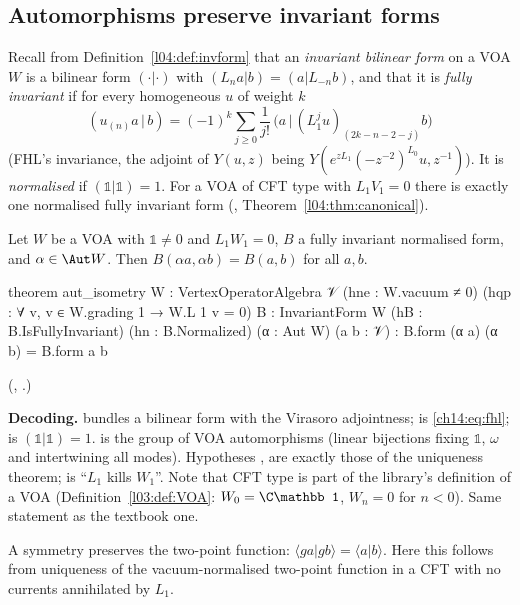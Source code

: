 \subsection{Automorphisms preserve invariant forms}

Recall from Definition~\ref{l04:def:invform} that an \emph{invariant bilinear form} on a VOA $W$ is a bilinear
form $(\cdot|\cdot)$ with $(L_na|b)=(a|L_{-n}b)$, and that it is \emph{fully invariant} if for every
homogeneous $u$ of weight $k$
\begin{equation}\label{ch14:eq:fhl}
  (u_{(n)}a\,|\,b)=(-1)^k\sum_{j\ge0}\frac{1}{j!}\,\bigl(a\,\big|\,(L_1^ju)_{(2k-n-2-j)}b\bigr)
\end{equation}
(FHL's invariance, the adjoint of $Y(u,z)$ being $Y(e^{zL_1}(-z^{-2})^{L_0}u,z^{-1})$).  It is
\emph{normalised} if $(\mathbb 1|\mathbb 1)=1$.  For a VOA of CFT type with $L_1V_1=0$ there is
exactly one normalised fully invariant form (, Theorem~\ref{l04:thm:canonical}).

\begin{theorem}\label{ch14:thm:autiso}
Let $W$ be a VOA with $\mathbb 1\ne0$ and $L_1W_1=0$, $B$ a fully invariant normalised form, and
$\alpha\in\Aut W$.  Then $B(\alpha a,\alpha b)=B(a,b)$ for all $a,b$.
\end{theorem}
\begin{leancode}
theorem aut_isometry {W : VertexOperatorAlgebra 𝒱} (hne : W.vacuum ≠ 0)
    (hqp : ∀ v, v ∈ W.grading 1 → W.L 1 v = 0) {B : InvariantForm W}
    (hB : B.IsFullyInvariant) (hn : B.Normalized) (α : Aut W) (a b : 𝒱) :
    B.form (α a) (α b) = B.form a b
\end{leancode}
(, .)

\begin{dictionary}
\textbf{Decoding.}   bundles a bilinear form  with the Virasoro
adjointness;  is \eqref{ch14:eq:fhl};  is
$(\mathbb 1|\mathbb 1)=1$.   is the group of VOA automorphisms (linear bijections
fixing $\mathbb 1$, $\omega$ and intertwining all modes).  Hypotheses ,  are exactly
those of the uniqueness theorem;  is ``$L_1$ kills $W_1$''.  Note that CFT type is part
of the library's definition of a VOA (Definition~\ref{l03:def:VOA}: $W_0=\C\mathbb 1$, $W_n=0$ for $n<0$).
Same statement as the textbook one.
\end{dictionary}
\begin{physics}
A symmetry preserves the two-point function: $\langle g a|g b\rangle=\langle a|b\rangle$. Here this follows from uniqueness of the vacuum-normalised two-point function in a CFT with no currents annihilated by $L_1$.
\end{physics}


